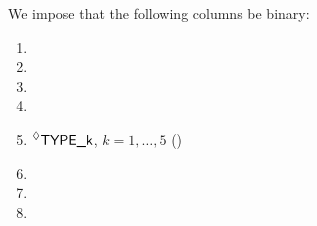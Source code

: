 We impose that the following columns be binary:
\begin{multicols}{3}
	\begin{enumerate}
		\item \roob{}
		\item \noop{}
		\item \mxpx{}
		\item \codeDeployment{}
		\item $\prescript{\lozenge}{}{\textsf{TYPE\_k}}$, $k = 1,\dots,5$ (\trash)
		\item \comp{}
		\item \mexpEvent{}
		\item \mayTriggerNonTrivialOperation{}
	\end{enumerate}
\end{multicols}
